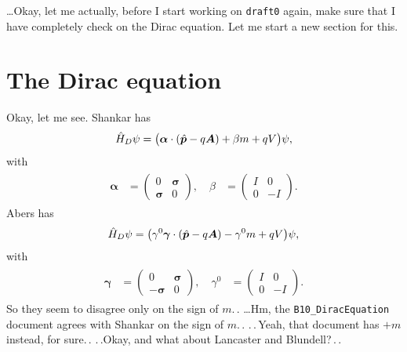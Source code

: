 \documentclass{report}
\newcommand{\bsacc}[3]{#1{\boldsymbol{#2}\hspace{#3em}}\hspace{-#3em}}
\newcommand{\hatbsp}{{\bsacc{\hat}{p}{.15}}}
\begin{document}
\ldots Okay, let me actually, before I start working on \texttt{draft0} again, make sure that I have completely check on the Dirac equation. Let me start a new section for this.

\section{The Dirac equation}
Okay, let me see. Shankar has
\begin{align}
	\hat H_D \psi = \big(
		\boldsymbol{\alpha} \cdot (\hatbsp - q \boldsymbol{A}) +
		\beta m +
		q V
	\big)\psi,
\end{align}
with
\begin{align}
\begin{aligned}
	\boldsymbol{\alpha} &=
		\begin{pmatrix}
		0 & 					\boldsymbol{\sigma} \\
		\boldsymbol{\sigma} & 	0
		\end{pmatrix},
		\quad
	\beta &=
		\begin{pmatrix}
		I & 					0 \\
		0 & 					-I
		\end{pmatrix}.
\end{aligned}
\end{align}
Abers has
\begin{align}
	\hat H_{D} \psi = \big(
		\gamma^0 \boldsymbol \gamma \cdot (\hatbsp - q \boldsymbol A) -
		\gamma^0 m + 
		q V
	\big)\psi,
\end{align}
with
\begin{align}
\begin{aligned}
	\boldsymbol{\gamma} &=
		\begin{pmatrix}
		0 & 					\boldsymbol{\sigma} \\
		-\boldsymbol{\sigma} & 	0
		\end{pmatrix},
		\quad
	\gamma^0 &=
		\begin{pmatrix}
		I & 					0 \\
		0 & 					-I
		\end{pmatrix}.
\end{aligned}
\end{align}
So they seem to disagree only on the sign of $m$.\,. 
\ldots Hm, the \texttt{B10\_DiracEquation} document agrees with Shankar on the sign of $m$.\,. .\,.\,Yeah, that document has $+m$ instead, for sure.\,. .\,.Okay, and what about Lancaster and Blundell?\,.\,. 
\end{document}
